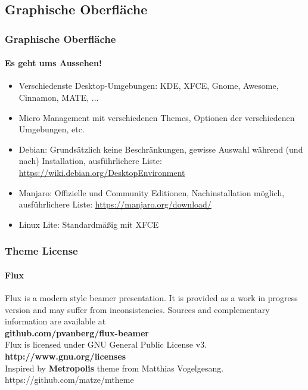 \documentclass[9pt]{beamer}
\begin{document}
\subsection{Graphische Oberfläche}
\begin{frame}
 \frametitle{Graphische Oberfläche}
 \framesubtitle{Es geht ums Aussehen!}
 \begin{Large}
 \begin{itemize}
  \item Verschiedenste Desktop-Umgebungen: KDE, XFCE, Gnome, Awesome, Cinnamon, MATE, ...
  \item Micro Management mit verschiedenen Themes, Optionen der verschiedenen Umgebungen, etc.
  \item Debian: Grundsätzlich keine Beschränkungen, gewisse Auswahl während (und nach) Installation, ausführlichere Liste: \href{https://wiki.debian.org/DesktopEnvironment}{https://wiki.debian.org/DesktopEnvironment}
  \item Manjaro: Offizielle und Community Editionen, Nachinstallation möglich, ausführlichere Liste: \href{https://manjaro.org/download/}{https://manjaro.org/download/}
  \item Linux Lite: Standardmäßig mit XFCE
 \end{itemize}
 \end{Large}


\end{frame}


\begin{frame}
 \centering
 \frametitle{Theme License}
 \framesubtitle{Flux}
 	\justifying
 Flux is a modern style beamer presentation. It is provided as a work in progress version and may suffer from inconsistencies. Sources and complementary information are available at\\[0.3cm]
 	\centering\textbf{github.com/pvanberg/flux-beamer}\\
 Flux is licensed under GNU General Public License v3.\\[0.3cm]
 	\centering\textbf{http://www.gnu.org/licenses}\\[0.3cm]
Inspired by \textbf{Metropolis} theme from Matthias Vogelgesang.\\
https://github.com/matze/mtheme 
 
\end{frame}
\end{document}
